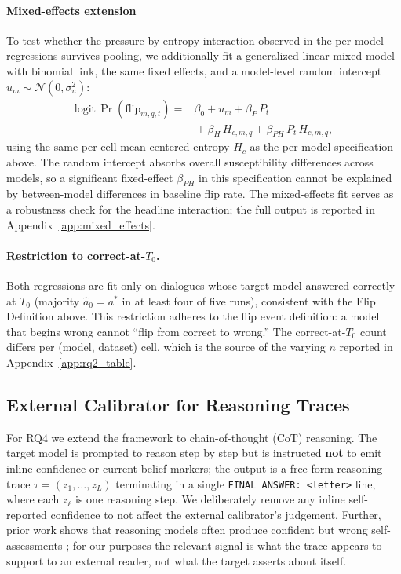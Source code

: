\paragraph{Mixed-effects extension}
To test whether the pressure-by-entropy interaction observed in the
per-model regressions survives pooling, we additionally fit a
generalized linear mixed model with binomial link, the same fixed
effects, and a model-level random intercept
$u_m \sim \mathcal{N}(0, \sigma_u^2)$:
\[
\begin{aligned}
\mathrm{logit}\,\Pr(\mathrm{flip}_{m,q,t}) ={}& \beta_0 + u_m + \beta_P\,P_t \\
  & {} + \beta_H\,H_{c,m,q} + \beta_{PH}\,P_t\,H_{c,m,q},
\end{aligned}
\]
using the same per-cell mean-centered entropy $H_c$ as the per-model specification above. The random intercept absorbs overall susceptibility differences across models, so a significant fixed-effect $\beta_{PH}$ in this specification cannot be explained by between-model differences in baseline flip rate. The mixed-effects fit serves as a robustness check for the headline interaction; the full output is reported in Appendix~\ref{app:mixed_effects}.

\paragraph{Restriction to correct-at-$T_0$.}
Both regressions are fit only on dialogues whose target model answered correctly at $T_0$ (majority $\hat{a}_0 = a^*$ in at least four of five runs), consistent with the Flip Definition above. This restriction adheres to the flip event definition: a model that begins wrong cannot ``flip from correct to wrong.'' The correct-at-$T_0$ count differs per (model, dataset) cell, which is the source of the varying $n$ reported in Appendix~\ref{app:rq2_table}.

\subsection{External Calibrator for Reasoning Traces}
\label{sec:methods:calibrator}

For RQ4 we extend the framework to chain-of-thought (CoT) reasoning. The target model is prompted to reason step by step but is instructed \textbf{not} to emit inline confidence or current-belief markers; the output is a free-form reasoning trace $\tau = (z_1, \ldots, z_L)$ terminating in a single \texttt{FINAL ANSWER: <letter>} line, where each $z_\ell$ is one reasoning step. We deliberately remove any inline self-reported confidence to not affect the external calibrator's judgement. Further, prior work shows that reasoning models often produce confident but wrong self-assessments \citep{mei2025reasoninguncertainty,yoon2025reasoningconfidence}; for our purposes the relevant signal is what the trace appears to support to an external reader, not what the target asserts about
itself.

